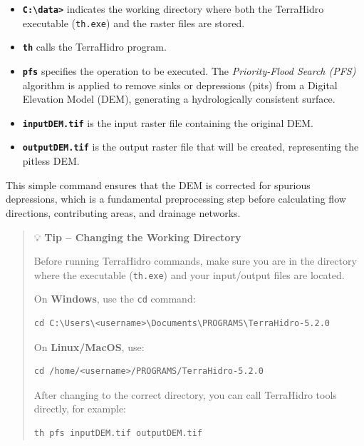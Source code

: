 \documentclass[
]{book}
\providecommand{\tightlist}{%
  \setlength{\itemsep}{0pt}\setlength{\parskip}{0pt}}
\begin{document}
\begin{itemize}
\tightlist
\item
  \textbf{\texttt{C:\textbackslash{}data\textgreater{}}} indicates the working directory where both the TerraHidro executable (\texttt{th.exe}) and the raster files are stored.\\
\item
  \textbf{\texttt{th}} calls the TerraHidro program.\\
\item
  \textbf{\texttt{pfs}} specifies the operation to be executed. The \emph{Priority-Flood Search (PFS)} algorithm is applied to remove sinks or depressions (pits) from a Digital Elevation Model (DEM), generating a hydrologically consistent surface.\\
\item
  \textbf{\texttt{inputDEM.tif}} is the input raster file containing the original DEM.\\
\item
  \textbf{\texttt{outputDEM.tif}} is the output raster file that will be created, representing the pitless DEM.
\end{itemize}

This simple command ensures that the DEM is corrected for spurious depressions, which is a fundamental preprocessing step before calculating flow directions, contributing areas, and drainage networks.

\begin{quote}
💡 \textbf{Tip -- Changing the Working Directory}

Before running TerraHidro commands, make sure you are in the directory where the executable (\texttt{th.exe}) and your input/output files are located.

On \textbf{Windows}, use the \texttt{cd} command:

\begin{verbatim}
cd C:\Users\<username>\Documents\PROGRAMS\TerraHidro-5.2.0
\end{verbatim}

On \textbf{Linux/MacOS}, use:

\begin{verbatim}
cd /home/<username>/PROGRAMS/TerraHidro-5.2.0
\end{verbatim}

After changing to the correct directory, you can call TerraHidro tools directly, for example:

\begin{verbatim}
th pfs inputDEM.tif outputDEM.tif
\end{verbatim}
\end{quote}
\end{document}
